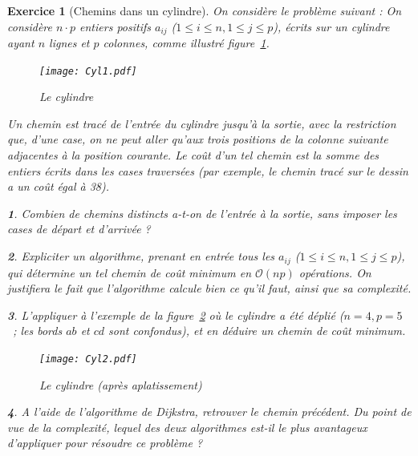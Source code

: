 \documentclass{article}
\theoremstyle{exostyle}
\newtheorem{exo}{Exercice}
\theoremstyle{partiestyle}
\newtheorem{partie}{}[exo]
\theoremstyle{questionstyle}
\begin{document}
\begin{exo}[Chemins dans un cylindre]
On considère le problème suivant :
On considère $n\cdot p$ entiers positifs $a_{ij}$ ($1\leq i\leq n, 1\leq
j\leq p$), écrits sur un cylindre ayant $n$ lignes et $p$ colonnes,
comme illustré figure~\ref{cyl1}.

\begin{figure}[h!]
\begin{center}
\texttt{[image: Cyl1.pdf]}
\caption{Le cylindre\label{cyl1}} 
\end{center}
\end{figure}

Un chemin est tracé de l'entrée du cylindre jusqu'à la sortie, avec la
restriction que, d'une case, on ne peut aller qu'aux trois positions
de la colonne suivante adjacentes à la position courante. Le coût d'un
tel chemin est la somme des entiers écrits dans les cases traversées
(par exemple, le chemin tracé sur le dessin a un coût égal à 38).

\begin{partie}
Combien de chemins distincts a-t-on de l'entrée à la
sortie, sans imposer les cases de départ et d'arrivée ?
\end{partie}
\begin{partie}
Expliciter un algorithme, prenant en entrée tous les $a_{ij}$ ($1\leq i\leq n, 1\leq
j\leq p$), qui détermine un tel chemin de
coût minimum en $\mathcal{O}(np)$ opérations. On justifiera le fait
que l'algorithme calcule bien ce qu'il faut, ainsi que sa complexité.
\end{partie}
\begin{partie}
L'appliquer à l'exemple de la figure~\ref{cyl2} où le cylindre
a été déplié ($n=4, p=5$~; les bords $ab$ et $cd$ sont confondus), et
en déduire un chemin de coût minimum.

\begin{figure}[h!]
\begin{center}
\texttt{[image: Cyl2.pdf]}
\caption{Le cylindre (après aplatissement)\label{cyl2}}
\end{center}
\end{figure}
\end{partie}
	
\begin{partie}
A l'aide de l'algorithme de Dijkstra, retrouver le
chemin précédent. Du point de vue de la complexité, lequel des deux
algorithmes est-il le plus avantageux d'appliquer pour résoudre ce
problème ?
\end{partie}

\end{exo}
\end{document}
